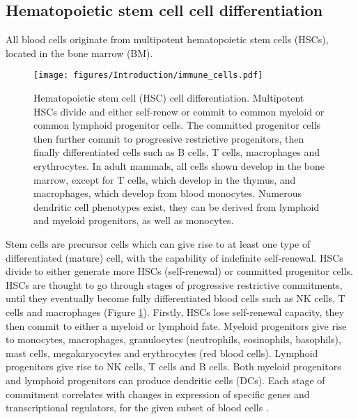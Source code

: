 \subsection{Hematopoietic stem cell cell differentiation}
All blood cells originate from multipotent hematopoietic stem cells (HSCs), located in the bone marrow (BM).
%
\begin{figure}[htb]
\centering\texttt{[image: figures/Introduction/immune\_cells.pdf]}
\caption[Hematopoietic system cell differentiation]{Hematopoietic stem cell (HSC) cell differentiation.
Multipotent HSCs divide and either self-renew or commit to common myeloid or common lymphoid progenitor cells.
The committed progenitor cells then further commit to progressive restrictive progenitors, then finally differentiated cells such as B cells, T cells, macrophages and erythrocytes.
In adult mammals, all cells shown develop in the bone marrow, except for T cells, which develop in the thymus, and macrophages, which develop from blood monocytes.
Numerous dendritic cell phenotypes exist, they can be derived from lymphoid and myeloid progenitors, as well as monocytes.}
\label{fig:HSC_differentiation}\end{figure}
Stem cells are precursor cells which can give rise to at least one type of differentiated (mature) cell, with the capability of indefinite self-renewal.
HSCs divide to either generate more HSCs (self-renewal) or committed progenitor cells.
HSCs are thought to go through stages of progressive restrictive commitments, until they eventually become fully differentiated blood cells such as NK cells, T cells and macrophages (Figure \ref{fig:HSC_differentiation}).
Firstly, HSCs lose self-renewal capacity, they then commit to either a myeloid or lymphoid fate.
Myeloid progenitors give rise to monocytes, macrophages, granulocytes (neutrophils, eosinophils, basophils), mast cells, megakaryocytes and erythrocytes (red blood cells).
Lymphoid progenitors give rise to NK cells, T cells and B cells.
Both myeloid progenitors and lymphoid progenitors can produce dendritic cells (DCs).
Each stage of commitment correlates with changes in expression of specific genes and transcriptional regulators, for the given subset of blood cells \cite{seita2010hematopoietic}.

